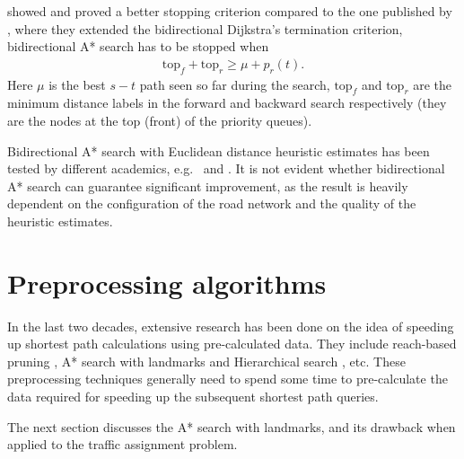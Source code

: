 \citet{GoldbergEPP} showed and proved a better stopping criterion compared to the one published by \citet{Pohl},
where they extended the bidirectional Dijkstra's termination criterion,
bidirectional A* search has to be stopped when
\begin{align}
    \text{top}_f + \text{top}_r \geq \mu + p_r(t).
\end{align}
Here $\mu$ is the best $s-t$ path seen so far during the search,
$\text{top}_f$ and $\text{top}_r$ are the minimum distance labels in the forward and backward search respectively (they are the nodes at the top (front) of the priority queues).

Bidirectional A* search with Euclidean distance heuristic estimates has been tested by different academics, e.g.\ \citet{Klunder} and \citet{Goldberg05}.
It is not evident whether bidirectional A* search can guarantee significant improvement,
as the result is heavily dependent on the configuration of the road network and the quality of the heuristic estimates.


\section{Preprocessing algorithms}
In the last two decades,
extensive research has been done on the idea of speeding up shortest path calculations using pre-calculated data.
They include reach-based pruning \citep{Goldberg}, A* search with landmarks \citep{GoldbergLandmarks} and Hierarchical search \citep{Ertl1998, Pearson}, etc.
These preprocessing techniques generally need to spend some time to pre-calculate the data required for speeding up the subsequent shortest path queries.

The next section discusses the A* search with landmarks,
and its drawback when applied to the traffic assignment problem.

